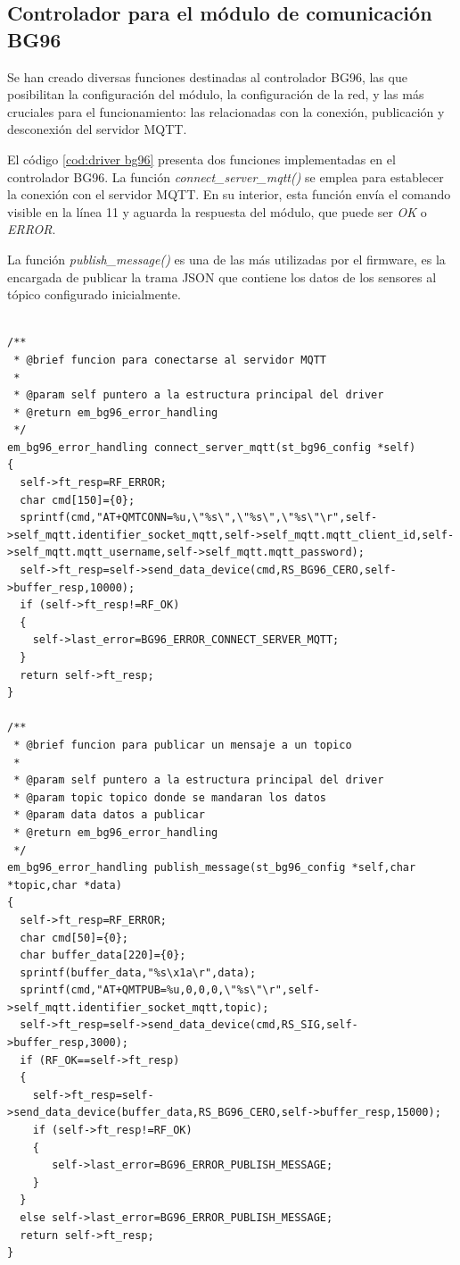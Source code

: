 \subsection{ Controlador para el módulo de comunicación BG96 } 
Se han creado diversas funciones destinadas al controlador BG96, las que posibilitan la configuración del módulo, la configuración de la red, y las más cruciales para el funcionamiento: las relacionadas con la conexión, publicación y desconexión del servidor MQTT.

El código \ref{cod:driver bg96} presenta dos funciones implementadas en el controlador BG96. La función \emph{connect\_server\_mqtt()} se emplea para establecer la conexión con el servidor MQTT. En su interior, esta función envía el comando visible en la línea 11 y aguarda la respuesta del módulo, que puede ser \emph{OK} o \emph{ERROR}.

La función \emph{publish\_message()} es una de las más utilizadas por el firmware, es la encargada de publicar la trama JSON que contiene los datos de los sensores al tópico configurado inicialmente. 
\begin{lstlisting}[label=cod:driver bg96,caption=Función de conexión y publicación al broker MQTT.]  % Start your code-block

/**
 * @brief funcion para conectarse al servidor MQTT
 * 
 * @param self puntero a la estructura principal del driver
 * @return em_bg96_error_handling 
 */
em_bg96_error_handling connect_server_mqtt(st_bg96_config *self)
{
  self->ft_resp=RF_ERROR;
  char cmd[150]={0};
  sprintf(cmd,"AT+QMTCONN=%u,\"%s\",\"%s\",\"%s\"\r",self->self_mqtt.identifier_socket_mqtt,self->self_mqtt.mqtt_client_id,self->self_mqtt.mqtt_username,self->self_mqtt.mqtt_password);
  self->ft_resp=self->send_data_device(cmd,RS_BG96_CERO,self->buffer_resp,10000);
  if (self->ft_resp!=RF_OK)
  {
    self->last_error=BG96_ERROR_CONNECT_SERVER_MQTT;
  }
  return self->ft_resp;
}

/**
 * @brief funcion para publicar un mensaje a un topico
 * 
 * @param self puntero a la estructura principal del driver
 * @param topic topico donde se mandaran los datos 
 * @param data datos a publicar
 * @return em_bg96_error_handling 
 */
em_bg96_error_handling publish_message(st_bg96_config *self,char *topic,char *data)
{
  self->ft_resp=RF_ERROR;
  char cmd[50]={0};
  char buffer_data[220]={0};
  sprintf(buffer_data,"%s\x1a\r",data);
  sprintf(cmd,"AT+QMTPUB=%u,0,0,0,\"%s\"\r",self->self_mqtt.identifier_socket_mqtt,topic);
  self->ft_resp=self->send_data_device(cmd,RS_SIG,self->buffer_resp,3000);
  if (RF_OK==self->ft_resp)
  {
    self->ft_resp=self->send_data_device(buffer_data,RS_BG96_CERO,self->buffer_resp,15000);
    if (self->ft_resp!=RF_OK)
    {
       self->last_error=BG96_ERROR_PUBLISH_MESSAGE;
    }   
  }
  else self->last_error=BG96_ERROR_PUBLISH_MESSAGE;
  return self->ft_resp;
}
\end{lstlisting}


